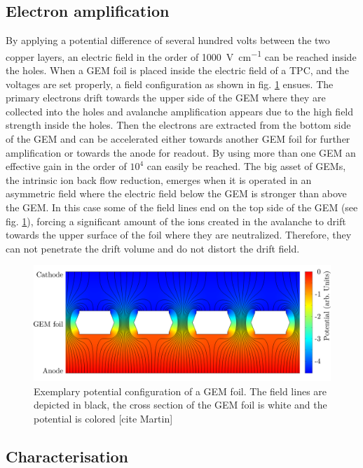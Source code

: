 \subsection{Electron amplification}
By applying a potential difference of several hundred volts between the two copper layers, an electric field in the order of \SI{1000}{\volt\per\centi\meter} can be reached inside the holes. When a GEM foil is placed inside the electric field of a TPC, and the voltages are set properly, a field configuration as shown in fig. \ref{fig: GEM_fieldlines} ensues. The primary electrons drift towards the upper side of the GEM where they are collected into the holes and avalanche amplification appears due to the high field strength inside the holes. Then the electrons are extracted from the bottom side of the GEM and can be accelerated either towards another GEM foil for further amplification or towards the anode for readout. By using more than one GEM an effective gain in the order of $10^4$ can easily be reached. The big asset of GEMs, the intrinsic ion back flow reduction, emerges when it is operated in an asymmetric field where the electric field below the GEM is stronger than above the GEM. In this case some of the field lines end on the top side of the GEM (see fig. \ref{fig: GEM_fieldlines}), forcing a significant amount of the ions created in the avalanche to drift towards the upper surface of the foil where they are neutralized. Therefore, they can not penetrate the drift volume and do not distort the drift field.
\begin{center}
\begin{figure}[]
\centering
\includegraphics[width=0.8\columnwidth]{pictures/GEM_fieldlines.pdf}
\caption{Exemplary potential configuration of a GEM foil. The field lines are depicted in black, the cross section of the GEM foil is white and the potential is colored [cite Martin]}
\label{fig: GEM_fieldlines}
\end{figure}
\end{center} 
\subsection{Characterisation}
